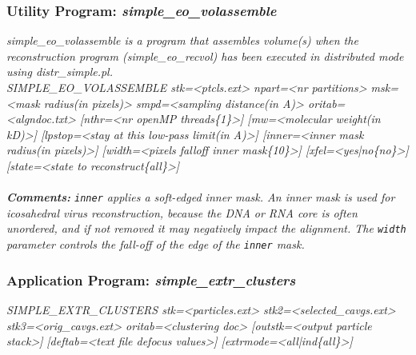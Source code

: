 \documentclass[review]{elsarticle}
\begin{document}
{\subsubsection{Utility Program: {\it{simple\_eo\_volassemble}}}
\label{eo_volassemble}
{\it{simple\_eo\_volassemble} is a program that assembles volume(s) when the reconstruction program ({\it{simple\_eo\_recvol}}) has been executed in distributed mode using {\it{distr\_simple.pl}.}\\
{\it{SIMPLE\_EO\_VOLASSEMBLE stk=<ptcls.ext> npart=<nr partitions> msk=<mask}}
{\it{radius(in pixels)> smpd=<sampling distance(in A)> oritab=<algndoc.txt>}}
{\it{[nthr=<nr openMP threads\{1\}>] [mw=<molecular weight(in kD)>] [lpstop=<stay at}}
{\it{this low-pass limit(in A)>] [inner=<inner mask radius(in pixels)>]}}
{\it{[width=<pixels falloff inner mask\{10\}>] [xfel=<yes|no\{no\}>] [state=<state}}
{\it{to reconstruct\{all\}>]}}
\\\\
\noindent\textbf{Comments:} \texttt{inner} applies a soft-edged inner mask. An inner mask is used for icosahedral virus reconstruction, because the DNA or RNA core is often unordered, and if not removed it may negatively impact the alignment. The \texttt{width} parameter controls the fall-off of the edge of the \texttt{inner} mask.

\subsubsection{Application Program: {\it{simple\_extr\_clusters}}}
\label{extr_clusters}
{\it{SIMPLE\_EXTR\_CLUSTERS stk=<particles.ext> stk2=<selected\_cavgs.ext>}}
{\it{stk3=<orig\_cavgs.ext> oritab=<clustering doc> [outstk=<output particle stack>]}}
{\it{[deftab=<text file defocus values>] [extrmode=<all|ind\{all\}>]}}

}}
\end{document}
